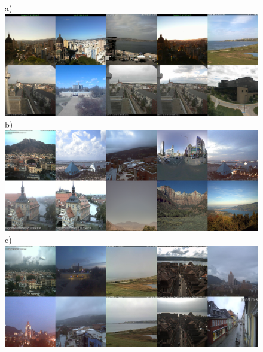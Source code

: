 \documentclass[final,3p,times,authoryear]{elsarticle}
\begin{document}
\begin{figure}
\centering
a)\includegraphics[trim = 0mm 0mm 0mm 0mm,clip,scale=0.14]{Images/13-0_Mean_7_8_300_tiles.png}
b)\includegraphics[trim = 0mm 0mm 0mm 0mm,clip,scale=0.14]{Images/13-3_Mean_7_6_100_tiles.png}
c)\includegraphics[trim = 0mm 0mm 0mm 0mm,clip,scale=0.14]{Images/13-5_K-mean_6_tiles.png}

\end{figure}
\end{document}
